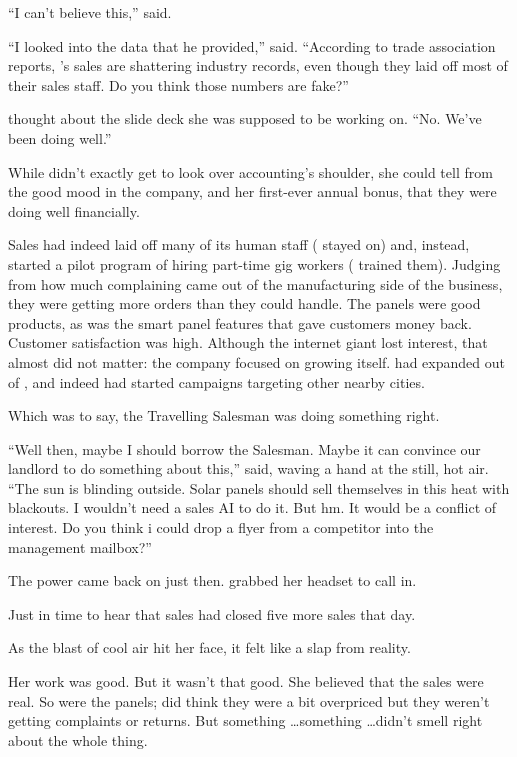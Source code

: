 ``I can't believe this,'' {\protag} said.

``I looked into the data that he provided,'' {\sidetag} said. ``According to trade association reports, \energyCompany{}'s sales are shattering industry records, even though they laid off most of their sales staff. Do you think those numbers are fake?''

{\protag} thought about the slide deck she was supposed to be working on. ``No. We’ve been doing well.''

While {\protag} didn’t exactly get to look over accounting's shoulder, she could tell from the good mood in the company, and her first-ever annual bonus, that they were doing well financially.

Sales had indeed laid off many of its human staff (\energyJerk{} stayed on) and, instead, started a pilot program of hiring part-time gig workers (\energyJerk{} trained them). Judging from how much complaining came out of the manufacturing side of the business, they were getting more orders than they could handle. The panels were good products, as was the smart panel features that gave customers money back. Customer satisfaction was high. Although the internet giant lost interest, that almost did not matter: the company focused on growing itself. \energyCompany{} had expanded out of \crunchyCity{}, and indeed had started campaigns targeting other nearby cities.

Which was to say, the Travelling Salesman was doing something right.

``Well then, maybe I should borrow the Salesman. Maybe it can convince our landlord to do something about this,'' {\protag} said, waving a hand at the still, hot air. ``The sun is blinding outside. Solar panels should sell themselves in this heat with blackouts. I wouldn't need a sales AI to do it. But hm. It would be a conflict of interest. Do you think i could drop a flyer from a competitor into the management mailbox?''

The power came back on just then. {\protag} grabbed her headset to call in.

Just in time to hear that sales had closed five more sales that day.

As the blast of cool air hit her face, it felt like a slap from reality.

Her work was good. But it wasn't that good. She believed that the sales were real. So were the panels; {\protag} did think they were a bit overpriced but they weren't getting complaints or returns. But something \dots something \dots didn't smell right about the whole thing.

